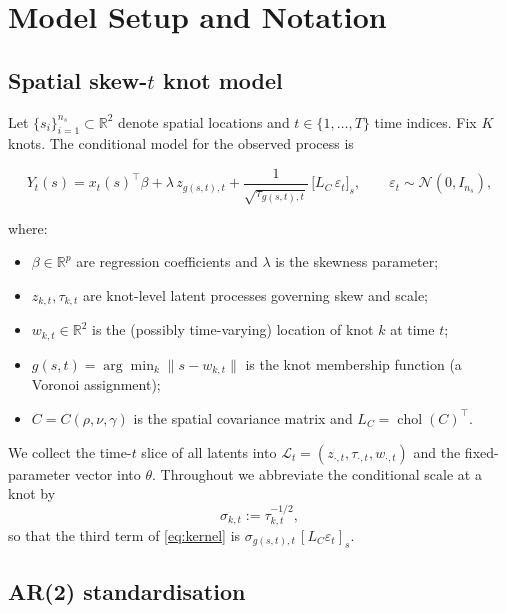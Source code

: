 \documentclass[11pt]{article}
\theoremstyle{definition}
\newcommand{\R}{\mathbb{R}}
\newcommand{\Norm}{\mathcal{N}}
\newcommand{\Ltot}{\mathcal{L}}
\begin{document}
\section{Model Setup and Notation}
\label{sec:model}

\subsection{Spatial skew-$t$ knot model}

Let $\{s_i\}_{i=1}^{n_s} \subset \R^2$ denote spatial locations and
$t \in \{1, \dots, T\}$ time indices. Fix $K$ knots. The conditional
model for the observed process is

\begin{equation}
  Y_t(s) = x_t(s)^\top \beta
         + \lambda \, z_{g(s, t), t}
         + \frac{1}{\sqrt{\tau_{g(s, t), t}}} \,
           \big[L_C \, \varepsilon_t\big]_s,
  \qquad \varepsilon_t \sim \Norm(0, I_{n_s}),
  \label{eq:kernel}
\end{equation}

where:
\begin{itemize}[leftmargin=2em, itemsep=0pt]
  \item $\beta \in \R^p$ are regression coefficients and $\lambda$ is
        the skewness parameter;
  \item $z_{k, t}, \tau_{k, t}$ are knot-level latent processes
        governing skew and scale;
  \item $w_{k, t} \in \R^2$ is the (possibly time-varying) location of
        knot $k$ at time $t$;
  \item $g(s, t) = \arg\min_k \|s - w_{k, t}\|$ is the knot membership
        function (a Voronoi assignment);
  \item $C = C(\rho, \nu, \gamma)$ is the spatial covariance matrix and
        $L_C = \operatorname{chol}(C)^\top$.
\end{itemize}

We collect the time-$t$ slice of all latents into
$\Ltot_t = (z_{\cdot, t}, \tau_{\cdot, t}, w_{\cdot, t})$ and the
fixed-parameter vector into $\theta$. Throughout we abbreviate the
conditional scale at a knot by
\begin{equation}
  \sigma_{k,t} := \tau_{k,t}^{-1/2},
  \label{eq:sigma-def}
\end{equation}
so that the third term of \eqref{eq:kernel} is
$\sigma_{g(s,t),t}\,[L_C\varepsilon_t]_s$.

\subsection{AR(2) standardisation}
\end{document}
